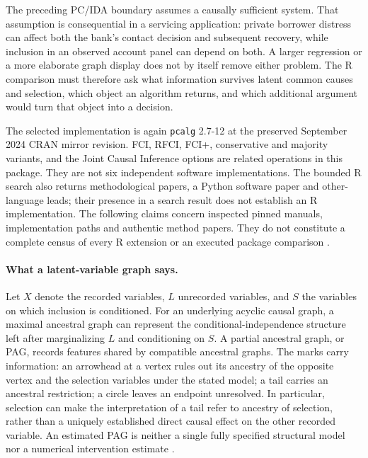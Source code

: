 The preceding PC/IDA boundary assumes a causally sufficient system. That
assumption is consequential in a servicing application: private borrower
distress can affect both the bank's contact decision and subsequent recovery,
while inclusion in an observed account panel can depend on both. A larger
regression or a more elaborate graph display does not by itself remove either
problem. The R comparison must therefore ask what information survives latent
common causes and selection, which object an algorithm returns, and which
additional argument would turn that object into a decision.

The selected implementation is again \texttt{pcalg} 2.7-12 at the preserved
September 2024 CRAN mirror revision. FCI, RFCI, FCI+, conservative and majority
variants, and the Joint Causal Inference options are related operations in
this package. They are not six independent software implementations. The
bounded R search also returns methodological papers, a Python software paper
and other-language leads; their presence in a search result does not establish
an R implementation. The following claims concern inspected pinned manuals,
implementation paths and authentic method papers. They do not constitute a
complete census of every R extension or an executed package comparison
\citep{exec13_latentr_primary}.

\paragraph{What a latent-variable graph says.}
Let $X$ denote the recorded variables, $L$ unrecorded variables, and $S$ the
variables on which inclusion is conditioned. For an underlying acyclic causal
graph, a maximal ancestral graph can represent the conditional-independence
structure left after marginalizing $L$ and conditioning on $S$. A partial
ancestral graph, or PAG, records features shared by compatible ancestral
graphs. The marks carry information: an arrowhead at a vertex rules out its
ancestry of the opposite vertex and the selection variables under the stated
model; a tail carries an ancestral restriction; a circle leaves an endpoint
unresolved. In particular, selection can make the interpretation of a tail
refer to ancestry of selection, rather than a uniquely established direct
causal effect on the other recorded variable. An estimated PAG is neither a
single fully specified structural model nor a numerical intervention estimate
\citep{exec13_latentr_primary,exec13_latentr_colombo2012}.

